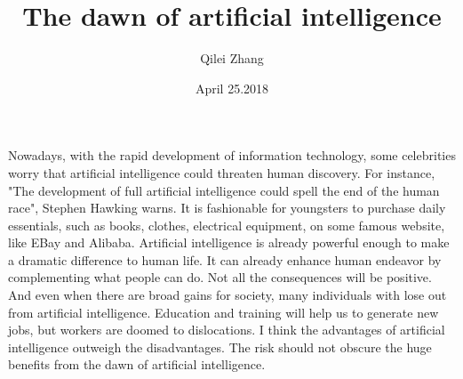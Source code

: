 \documentclass{article}
\author{Qilei Zhang}
\date{April 25.2018}
\title{The dawn of artificial intelligence}
\begin{document}
\maketitle
Nowadays, with the rapid development of information technology, some celebrities worry that artificial intelligence could threaten human discovery. For instance, "The development of full artificial intelligence could spell the end of the human race", Stephen Hawking warns.
It is fashionable for youngsters to purchase daily essentials, such as books, clothes, electrical equipment, on some famous website, like EBay and Alibaba. Artificial intelligence is already powerful enough to make a dramatic difference to human life. It can already enhance human endeavor by complementing what people can do. Not all the consequences will be positive. And even when there are broad gains for society, many individuals with lose out from artificial intelligence. Education and training will help us to generate new jobs, but workers are doomed to dislocations. I think the advantages of artificial intelligence outweigh the disadvantages. The risk should not obscure the huge benefits from the dawn of artificial intelligence.
\end{document}
